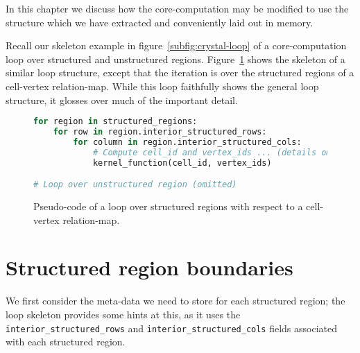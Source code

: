 \label{chap:exploit-structure}

In this chapter we discuss how the core-computation may be modified to use the structure which we have extracted and conveniently laid out in memory.


Recall our skeleton example in figure~\ref{subfig:crystal-loop} of a core-computation loop over structured and unstructured regions. Figure~\ref{fig:skeleton-structured-loop} shows the skeleton of a similar loop structure, except that the iteration is over the structured regions of a cell-vertex relation-map. While this loop faithfully shows the general loop structure, it glosses over much of the important detail.

\begin{figure}
\newsavebox{\thelisting}
\begin{lrbox}{\thelisting}
\begin{lstlisting}[language=python]
for region in structured_regions:
	for row in region.interior_structured_rows:
		for column in region.interior_structured_cols:
			# Compute cell_id and vertex_ids ... (details omitted)
			kernel_function(cell_id, vertex_ids)

# Loop over unstructured region (omitted)
\end{lstlisting}
\end{lrbox}

\usebox{\thelisting}
\caption{Pseudo-code of a loop over structured regions with respect to a cell-vertex relation-map.}
\label{fig:skeleton-structured-loop}
\end{figure}

\section{Structured region boundaries}
We first consider the meta-data we need to store for each structured region; the loop skeleton provides some hints at this, as it uses the \lstinline|interior_structured_rows| and \lstinline|interior_structured_cols| fields associated with each structured region.




